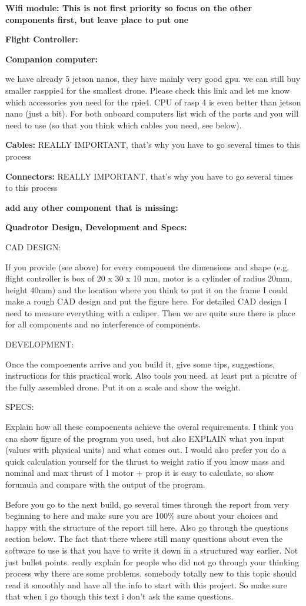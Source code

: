 \textbf{Wifi module: This is not first priority so focus on the other components first, but leave place to put one}

\textbf{Flight Controller:}

\textbf{Companion computer:}

we have already 5 jetson nanos, they have mainly very good gpu. we can still buy smaller rasppie4 for the smallest drone. Please check this link \cite{rpi_products} and let me know which accessories you need for the rpie4. CPU of rasp 4 is even better than jetson nano (just a bit). For both onboard computers list wich of the ports and you will need to use (so that you think which cables you need, see below).

\textbf{Cables:} REALLY IMPORTANT, that's why you have to go several times to this process

\textbf{Connectors:} REALLY IMPORTANT, that's why you have to go several times to this process

\textbf{add any other component that is missing:}


\textbf{Quadrotor Design, Development and Specs:}

CAD DESIGN:

If you provide (see above) for every component the dimensions and shape (e.g. flight controller is box of 20 x 30 x 10 mm, motor is a cylinder of radius 20mm, height 40mm) and the location where you think to put it on the frame I could make a rough CAD design and put the figure here. For detailed CAD design I need to measure everything with a caliper. Then we are quite sure there is place for all components and no interference of components.


DEVELOPMENT:

Once the compoenents arrive and you build it, give some tips, suggestions, instructions for this practical work. Also tools you need. at least put a picutre of the fully assembled drone. Put it on a scale and show the weight.

SPECS:

Explain how all these compoenents achieve the overal requirements. I think you cna show figure of the program you used, but also EXPLAIN what you input (values with physical units) and what comes out. I would also prefer you do a quick calculation yourself for the thrust to weight ratio if you know mass and nominal and max thrust of 1 motor + prop it is easy to calculate, so show forumula and compare with the output of the program.


Before you go to the next build, go several times through the report from very beginning to here and make sure you are 100\% sure about your choices and happy with the structure of the report till here. Also go through the questions section below. The fact that there where still many questions about even the software to use is that you have to write it down in a structured way earlier. Not just bullet points. really explain for people who did not go through your thinking process why there are some problems. somebody totally new to this topic should read it smoothly and have all the info to start with this project. So make sure that when i go though this text i don't ask the same questions.

